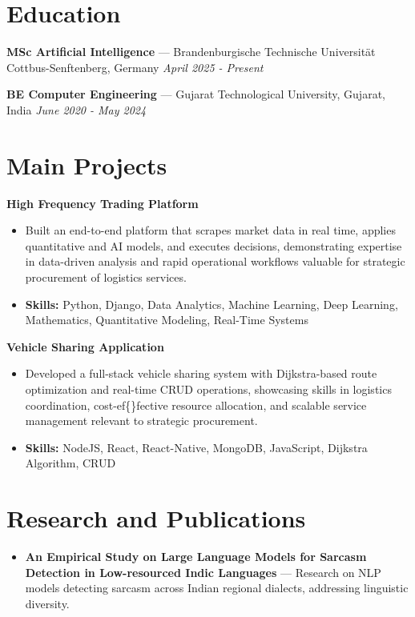 \documentclass[a4paper,10pt]{article}
\begin{document}
\section*{Education}
\textbf{MSc Artificial Intelligence} — Brandenburgische Technische Universität Cottbus-Senftenberg, Germany \hfill \textit{April 2025 - Present}\par
\vspace{1.5pt}
\textbf{BE Computer Engineering} — Gujarat Technological University, Gujarat, India \hfill \textit{June 2020 - May 2024}\par

\section*{Main Projects}
\textbf{High Frequency Trading Platform}\par
\vspace{1pt}
\begin{itemize}
  \item Built an end-to-end platform that scrapes market data in real time, applies quantitative and AI models, and executes decisions, demonstrating expertise in data-driven analysis and rapid operational workflows valuable for strategic procurement of logistics services.
  \item \textbf{Skills:} Python, Django, Data Analytics, Machine Learning, Deep Learning, Mathematics, Quantitative Modeling, Real-Time Systems
\end{itemize}
\vspace{3pt}
\textbf{Vehicle Sharing Application}\par
\vspace{1pt}
\begin{itemize}
  \item Developed a full-stack vehicle sharing system with Dijkstra-based route optimization and real-time CRUD operations, showcasing skills in logistics coordination, cost-ef\{\}fective resource allocation, and scalable service management relevant to strategic procurement.
  \item \textbf{Skills:} NodeJS, React, React-Native, MongoDB, JavaScript, Dijkstra Algorithm, CRUD
\end{itemize}

\section*{Research and Publications}
\begin{itemize}
\item \textbf{An Empirical Study on Large Language Models for Sarcasm Detection in Low-resourced Indic Languages} — Research on NLP models detecting sarcasm across Indian regional dialects, addressing linguistic diversity.
\end{itemize}
\end{document}
